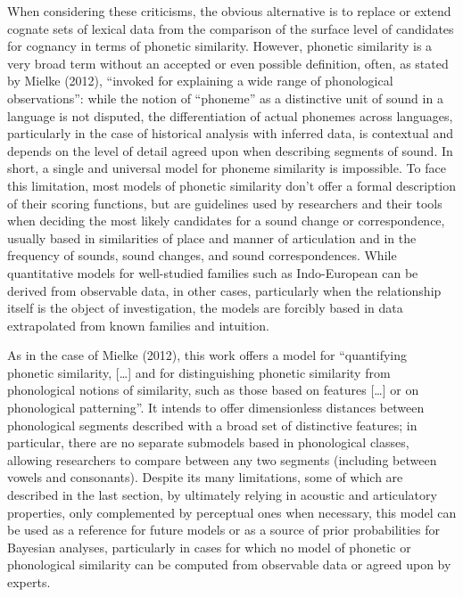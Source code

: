 \documentclass[a4paper]{article}
\begin{document}
When considering these criticisms, the obvious alternative is to replace
or extend cognate sets of lexical data from the comparison of the
surface level of candidates for cognancy in terms of phonetic
similarity. However, phonetic similarity is a very broad term without an
accepted or even possible definition, often, as stated by Mielke (2012),
``invoked for explaining a wide range of phonological observations'':
while the notion of ``phoneme'' as a distinctive unit of sound in a
language is not disputed, the differentiation of actual phonemes across
languages, particularly in the case of historical analysis with inferred
data, is contextual and depends on the level of detail agreed upon when
describing segments of sound. In short, a single and universal model for
phoneme similarity is impossible. To face this limitation, most models
of phonetic similarity don't offer a formal description of their scoring
functions, but are guidelines used by researchers and their tools when
deciding the most likely candidates for a sound change or
correspondence, usually based in similarities of place and manner of
articulation and in the frequency of sounds, sound changes, and sound
correspondences. While quantitative models for well-studied families
such as Indo-European can be derived from observable data, in other cases, particularly when
the relationship itself is the object of investigation, the models are
forcibly based in data extrapolated from known families and intuition.

As in the case of Mielke (2012), this work offers a model for
``quantifying phonetic similarity, {[}\ldots{}{]} and for distinguishing
phonetic similarity from phonological notions of similarity, such as
those based on features {[}\ldots{}{]} or on phonological patterning''.
It intends to offer dimensionless distances between phonological
segments described with a broad set of distinctive features; in
particular, there are no separate submodels based in phonological
classes, allowing researchers to compare between any two segments
(including between vowels and consonants). Despite its many limitations,
some of which are described in the last section, by ultimately relying
in acoustic and articulatory properties, only complemented by perceptual
ones when necessary, this model can be used as a reference for future
models or as a source of prior probabilities for Bayesian analyses,
particularly in cases for which no model of phonetic or phonological
similarity can be computed from observable data or agreed upon by
experts.
\end{document}
